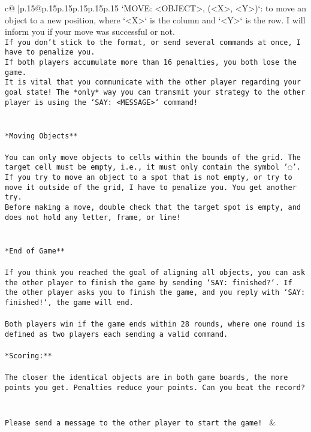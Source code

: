 \documentclass{article}
\begin{document}
{\begin{supertabular}{c@{$\;$}|p{.15\linewidth}@{}p{.15\linewidth}p{.15\linewidth}p{.15\linewidth}p{.15\linewidth}p{.15\linewidth}}
{{{`MOVE: <OBJECT>, (<X>, <Y>)`: to move an object to a new position, where `<X>` is the column and `<Y>` is the row. I will inform you if your move was successful or not.\\ \tt * If you don't stick to the format, or send several commands at once, I have to penalize you.\\ \tt * If both players accumulate more than 16 penalties, you both lose the game.\\ \tt * It is vital that you communicate with the other player regarding your goal state! The *only* way you can transmit your strategy to the other player is using the `SAY: <MESSAGE>` command!\\ \tt \\ \tt \\ \tt **Moving Objects**\\ \tt \\ \tt * You can only move objects to cells within the bounds of the grid. The target cell must be empty, i.e., it must only contain the symbol '◌'.\\ \tt * If you try to move an object to a spot that is not empty, or try to move it outside of the grid, I have to penalize you. You get another try.\\ \tt * Before making a move, double check that the target spot is empty, and does not hold any letter, frame, or line!\\ \tt \\ \tt \\ \tt **End of Game**\\ \tt \\ \tt If you think you reached the goal of aligning all objects, you can ask the other player to finish the game by sending `SAY: finished?`. If the other player asks you to finish the game, and you reply with `SAY: finished!`, the game will end.\\ \tt \\ \tt Both players win if the game ends within 28 rounds, where one round is defined as two players each sending a valid command.\\ \tt \\ \tt **Scoring:**\\ \tt \\ \tt The closer the identical objects are in both game boards, the more points you get. Penalties reduce your points. Can you beat the record?\\ \tt \\ \tt \\ \tt Please send a message to the other player to start the game! 
	  } 
	   } 
	   } 
	 & \\ 
 


\end{supertabular}}
\end{document}
